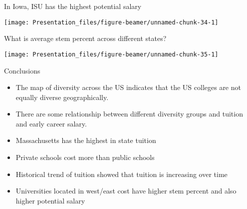 \documentclass[
  ignorenonframetext,
]{beamer}
\providecommand{\tightlist}{%
  \setlength{\itemsep}{0pt}\setlength{\parskip}{0pt}}
\begin{document}
\begin{frame}{In Iowa, ISU has the highest potential salary}
\protect\hypertarget{in-iowa-isu-has-the-highest-potential-salary}{}

\begin{center}\texttt{[image: Presentation\_files/figure-beamer/unnamed-chunk-34-1]} \end{center}

\end{frame}

\begin{frame}{What is average stem percent across different states?}
\protect\hypertarget{what-is-average-stem-percent-across-different-states}{}

\begin{center}\texttt{[image: Presentation\_files/figure-beamer/unnamed-chunk-35-1]} \end{center}

\end{frame}

\begin{frame}{Conclusions}
\protect\hypertarget{conclusions}{}

\begin{itemize}
\tightlist
\item
  The map of diversity across the US indicates that the US colleges are
  not equally diverse geographically.
\item
  There are some relationship between different diversity groups and
  tuition and early career salary.
\item
  Massachusetts has the highest in state tuition
\item
  Private schools cost more than public schools
\item
  Historical trend of tuition showed that tuition is increasing over
  time
\item
  Universities located in west/east cost have higher stem percent and
  also higher potential salary
\end{itemize}

\end{frame}
\end{document}
